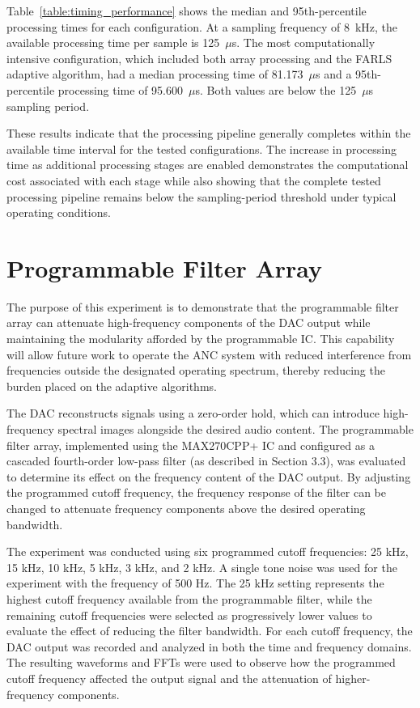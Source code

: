 Table~\ref{table:timing_performance} shows the median and 95th-percentile processing times for each configuration. At a sampling frequency of 8~kHz, the available processing time per sample is 125~$\mu$s. The most computationally intensive configuration, which included both array processing and the FARLS adaptive algorithm, had a median processing time of 81.173~$\mu$s and a 95th-percentile processing time of 95.600~$\mu$s. Both values are below the 125~$\mu$s sampling period.

These results indicate that the processing pipeline generally completes within the available time interval for the tested configurations. The increase in processing time as additional processing stages are enabled demonstrates the computational cost associated with each stage while also showing that the complete tested processing pipeline remains below the sampling-period threshold under typical operating conditions.

\section{Programmable Filter Array}
The purpose of this experiment is to demonstrate that the programmable filter array can attenuate high-frequency components of the DAC output while maintaining the modularity afforded by the programmable IC. This capability will allow future work to operate the ANC system with reduced interference from frequencies outside the designated operating spectrum, thereby reducing the burden placed on the adaptive algorithms.

The DAC reconstructs signals using a zero-order hold, which can introduce high-frequency spectral images alongside the desired audio content. The programmable filter array, implemented using the MAX270CPP+ IC and configured as a cascaded fourth-order low-pass filter (as described in Section 3.3), was evaluated to determine its effect on the frequency content of the DAC output. By adjusting the programmed cutoff frequency, the frequency response of the filter can be changed to attenuate frequency components above the desired operating bandwidth.

The experiment was conducted using six programmed cutoff frequencies: 25 kHz, 15 kHz, 10 kHz, 5 kHz, 3 kHz, and 2 kHz. A single tone noise was used for the experiment with the frequency of 500 Hz. The 25 kHz setting represents the highest cutoff frequency available from the programmable filter, while the remaining cutoff frequencies were selected as progressively lower values to evaluate the effect of reducing the filter bandwidth. For each cutoff frequency, the DAC output was recorded and analyzed in both the time and frequency domains. The resulting waveforms and FFTs were used to observe how the programmed cutoff frequency affected the output signal and the attenuation of higher-frequency components.


